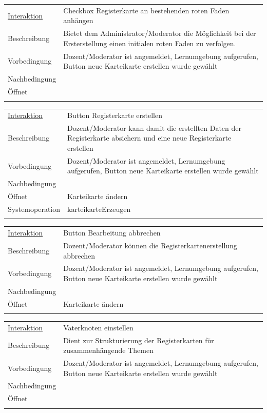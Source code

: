 \documentclass[12pt,a4paper]{article}
\begin{document}
{\begin{tabular}{l p{12cm}}
\underline{Interaktion} & Checkbox Registerkarte an bestehenden roten Faden anhängen    \\ 
Beschreibung   	 		& Bietet dem Administrator/Moderator die Möglichkeit bei der Ersterstellung einen initialen roten Faden zu verfolgen. \\
Vorbedingung	 		& Dozent/Moderator ist angemeldet, Lernumgebung aufgerufen, Button neue Karteikarte erstellen wurde gewählt\\
Nachbedingung	 		& \\
Öffnet			 		&  \\\\
\end{tabular}

\begin{tabular}{l p{12cm}}
\underline{Interaktion} & Button Registerkarte erstellen   \\ 
Beschreibung   	 		& Dozent/Moderator kann damit die erstellten Daten der Registerkarte absichern und eine neue Registerkarte erstellen\\
Vorbedingung	 		& Dozent/Moderator ist angemeldet, Lernumgebung aufgerufen, Button neue Karteikarte erstellen wurde gewählt\\
Nachbedingung	 		& \\
Öffnet			 		& \glqq Karteikarte ändern\grqq \\
Systemoperation & karteikarteErzeugen\\\\
\end{tabular}

\begin{tabular}{l p{12cm}}
\underline{Interaktion} & Button Bearbeitung abbrechen   \\ 
Beschreibung   	 		& Dozent/Moderator können die Registerkartenerstellung abbrechen\\
Vorbedingung	 		& Dozent/Moderator ist angemeldet, Lernumgebung aufgerufen, Button neue Karteikarte erstellen wurde gewählt\\
Nachbedingung	 		& \\
Öffnet			 		& \glqq Karteikarte ändern\grqq \\\\
\end{tabular}

\begin{tabular}{l p{12cm}}
\underline{Interaktion} & Vaterknoten einstellen   \\ 
Beschreibung   	 		& Dient zur Strukturierung der Registerkarten für zusammenhängende Themen\\
Vorbedingung	 		& Dozent/Moderator ist angemeldet, Lernumgebung aufgerufen, Button neue Karteikarte erstellen wurde gewählt\\
Nachbedingung	 		& \\
Öffnet			 		& \\\\
\end{tabular}

}
\end{document}
